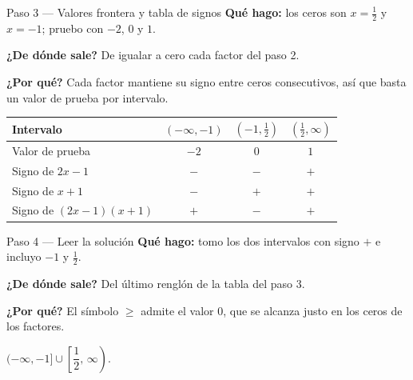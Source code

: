 \documentclass[11pt]{article}
\begin{document}
\begin{paso}{Paso 3 --- Valores frontera y tabla de signos}
\textbf{Qué hago:} los ceros son $x=\tfrac12$ y $x=-1$; pruebo con $-2$, $0$ y $1$.

\textbf{¿De dónde sale?} De igualar a cero cada factor del paso 2.

\textbf{¿Por qué?} Cada factor mantiene su signo entre ceros consecutivos, así que basta un valor de prueba por intervalo.

\begin{center}
\begin{tabular}{|l|c|c|c|}
\hline
Intervalo & $(-\infty,-1)$ & $\left(-1,\tfrac12\right)$ & $\left(\tfrac12,\infty\right)$ \\
\hline
Valor de prueba & $-2$ & $0$ & $1$ \\
Signo de $2x-1$ & $-$ & $-$ & $+$ \\
Signo de $x+1$ & $-$ & $+$ & $+$ \\
\hline
Signo de $(2x-1)(x+1)$ & $+$ & $-$ & $+$ \\
\hline
\end{tabular}
\end{center}
\end{paso}

\begin{paso}{Paso 4 --- Leer la solución}
\textbf{Qué hago:} tomo los dos intervalos con signo $+$ e incluyo $-1$ y $\tfrac12$.

\textbf{¿De dónde sale?} Del último renglón de la tabla del paso 3.

\textbf{¿Por qué?} El símbolo $\ge$ admite el valor $0$, que se alcanza justo en los ceros de los factores.
\end{paso}

\begin{center}
\end{center}

\begin{resp}
$(-\infty,-1]\cup\left[\dfrac12,\,\infty\right)$.
\end{resp}
\end{document}
